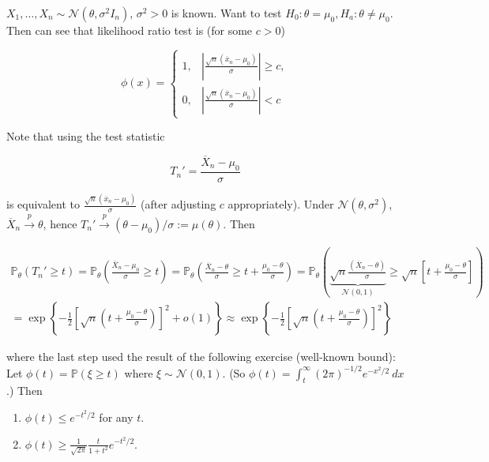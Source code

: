 \begin{example}

\(X_1, \ldots, X_n \sim \mathcal{N}(\theta, \sigma^2 I_n)\), \(\sigma^2 > 0\) is known. Want to test \(H_0: \theta = \mu_0, H_a: \theta \neq \mu_0\). Then can see that likelihood ratio test is (for some \(c > 0\))

\[
\phi(x) = \begin{cases}
1, & \left| \frac{\sqrt{n} (\overline{x}_n - \mu_0)}{\sigma} \right| \geq c, \\
0, &  \left| \frac{\sqrt{n} (\overline{x}_n - \mu_0)}{\sigma} \right| < c
\end{cases}
\]

Note that using the test statistic

\[
T_n' = \frac{\overline{X}_n - \mu_0}{\sigma} 
\]

is equivalent to \(\frac{\sqrt{n} (\overline{x}_n - \mu_0)}{\sigma}\) (after adjusting \(c\) appropriately). Under \(\mathcal{N}(\theta, \sigma^2)\), \(\overline{X}_n \xrightarrow{p} \theta\), hence \(T_n' \xrightarrow{p}(\theta - \mu_0)/\sigma := \mu(\theta)\). Then

\begin{multline*}
\mathbb{P}_\theta(T_n' \geq t) = \mathbb{P}_\theta \left( \frac{\overline{X}_n - \mu_0}{\sigma} \geq t \right) =   \mathbb{P}_\theta \left( \frac{\overline{X}_n - \theta}{\sigma} \geq t + \frac{\mu_0 - \theta}{\sigma} \right)  =   \mathbb{P}_\theta \left( \underbrace{ \sqrt{n} \frac{(\overline{X}_n - \theta)}{\sigma}}_{\mathcal{N}(0,1)} \geq \sqrt{n} \left[ t + \frac{\mu_0 - \theta}{\sigma} \right] \right) 
\\ = \exp \left\{ - \frac{1}{2} \left[ \sqrt{n} \left(t + \frac{\mu_0 - \theta}{\sigma} \right) \right]^2 + o(1) \right\} \approx \exp \left\{ - \frac{1}{2} \left[ \sqrt{n} \left(t + \frac{\mu_0 - \theta}{\sigma} \right) \right]^2 \right\}
\end{multline*}

where the last step used the result of the following exercise (well-known bound): Let \(\phi(t) = \mathbb{P}(\xi \geq t)\) where \(\xi \sim \mathcal{N}(0,1)\). (So \(\phi(t) = \int_t^\infty (2 \pi)^{-1/2} e^{-x^2/2} \ dx\).) Then

\begin{enumerate}

\item \(\phi(t) \leq e^{-t^2/2}\) for any \(t\).

\item \(\phi(t) \geq \frac{1}{\sqrt{2\pi}} \frac{t}{1+t^2} e^{-t^2/2}.\)


\end{enumerate}
\end{example}
